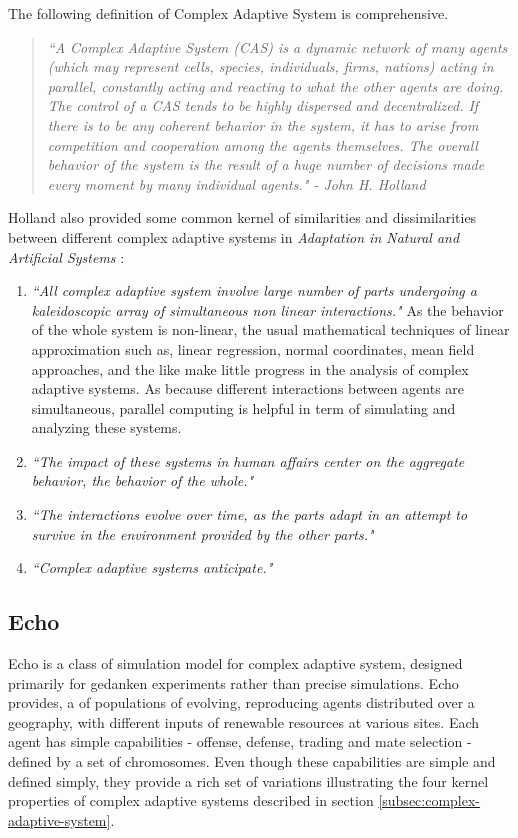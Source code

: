 The following definition of Complex Adaptive System is comprehensive.

\begin{quote}
\textsl{``A Complex Adaptive System (CAS) is a dynamic network of many agents (which may represent cells, species, individuals, firms, nations) acting in parallel, constantly acting and reacting to what the other agents are doing. The control of a CAS tends to be highly dispersed and decentralized. If there is to be any coherent behavior in the system, it has to arise from competition and cooperation among the agents themselves. The overall behavior of the system is the result of a huge number of decisions made every moment by many individual agents." - John H. Holland}
\end{quote}

Holland also provided some common kernel of similarities and dissimilarities between different complex adaptive systems in \textsl{Adaptation in Natural and Artificial Systems} \cite{holland1975}:

\begin{enumerate}
	\item \textsl{``All complex adaptive system involve large number of parts undergoing a kaleidoscopic array of simultaneous non linear interactions."} As the behavior of the whole system is non-linear, the usual mathematical techniques of linear approximation such as, linear regression, normal coordinates, mean field approaches, and the like make little progress in the analysis of complex adaptive systems. As because different interactions between agents are simultaneous, parallel computing is helpful in term of simulating and analyzing these systems. 
	\item \textsl{``The impact of these systems in human affairs center on the aggregate behavior, the behavior of the whole."}
	\item \textsl{``The interactions evolve over time, as the parts adapt in an attempt to survive in the environment provided by the other parts."}
	\item \textsl{``Complex adaptive systems anticipate."}
\end{enumerate}

\subsection{Echo}
\label{subsec:echo}
Echo is a class of simulation model for complex adaptive system, designed primarily for gedanken experiments rather than precise simulations. Echo provides, a of populations of evolving, reproducing agents distributed over a geography, with different inputs of renewable resources at various sites. Each agent has simple capabilities - offense, defense, trading and mate selection - defined by a set of chromosomes. Even though these capabilities are simple and defined simply, they provide a rich set of variations illustrating the four kernel properties of complex adaptive systems described in section \ref{subsec:complex-adaptive-system}.

